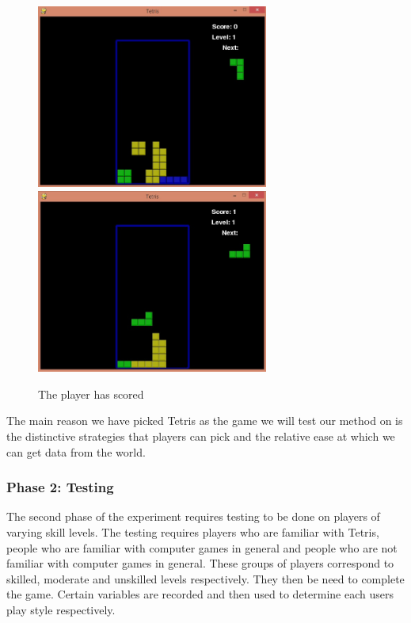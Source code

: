 \documentclass[11pt]{article}
\begin{document}
\FloatBarrier
\begin{figure}[!h]
	\centering
	\includegraphics[width=3in]{score1.jpg}
	\includegraphics[width=3in]{score2.jpg}	
	
	\caption{The player has scored}
	\label{Figure 3}

\end{figure}
\FloatBarrier
\vspace{3.0 mm}

The main reason we have picked Tetris as the game we will test our method on is the distinctive strategies that players can pick and the relative ease at which we can get data from the world.

\subsubsection{Phase 2: Testing}

The second phase of the experiment requires testing to be done on players of varying skill levels. The testing requires players who are familiar with Tetris, people who are familiar with computer games in general and people who are not familiar with computer games in general. These groups of players correspond to skilled, moderate and unskilled levels respectively. They then be need to complete the game. Certain variables are recorded and then used to determine each users play style respectively.
\vspace{6.0 mm}
\end{document}
